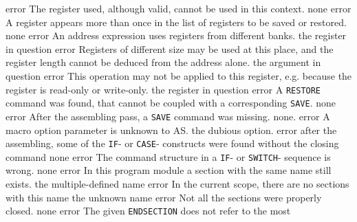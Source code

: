 \documentclass[12pt,twoside]{report}
\newcommand{\tty}[1]{{\tt #1}}
\begin{document}
\begin{description}
               {error}
               {The register used, although valid, cannot be used in this
                context.}
               {none}
               {error}
               {A register appears more than once in the list of registers
                to be saved or restored.}
               {none}
               {error}
               {An address expression uses registers from different banks.}
               {the register in question}
               {error}
               {Registers of different size may be used at this place, and
                 the register length cannot be deduced from the address alone.}
               {the argument in question}
               {error}
               {This operation may not be applied to this register, e.g. because
                the register is read-only or write-only.}
               {the register in question}
               {error}
               {A \tty{RESTORE} command was found, that cannot be coupled with a
                corresponding \tty{SAVE}.}
               {none}
               {error}
               {After the assembling pass, a \tty{SAVE} command was missing.}
               {none.}
               {error}
               {A macro option parameter is unknown to AS.}
               {the dubious option.}
               {error}
               {after the assembling, some of the \tty{IF}- or \tty{CASE}- constructs
                were found without the closing command}
               {none}
               {error}
               {The command structure in a \tty{IF}- or \tty{SWITCH}- sequence is
                wrong.}
               {none}
               {error}
               {In this program module a section with the same name still
                exists.}
               {the multiple-defined name}
               {error}
               {In the current scope, there are no sections with this name}
               {the unknown name}
               {error}
               {Not all the sections were properly closed.}
               {none}
               {error}
               {The given \tty{ENDSECTION} does not refer to the most
}
\end{description}
\end{document}
